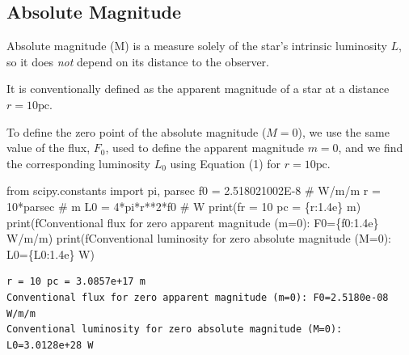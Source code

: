 \documentclass[
  letterpaper,
  DIV=11,
  numbers=noendperiod]{scrreprt}
\newenvironment{Shaded}{\begin{snugshade}}{\end{snugshade}}
\newcommand{\BuiltInTok}[1]{\textcolor[rgb]{0.00,0.23,0.31}{#1}}
\newcommand{\CommentTok}[1]{\textcolor[rgb]{0.37,0.37,0.37}{#1}}
\newcommand{\DecValTok}[1]{\textcolor[rgb]{0.68,0.00,0.00}{#1}}
\newcommand{\FloatTok}[1]{\textcolor[rgb]{0.68,0.00,0.00}{#1}}
\newcommand{\ImportTok}[1]{\textcolor[rgb]{0.00,0.46,0.62}{#1}}
\newcommand{\NormalTok}[1]{\textcolor[rgb]{0.00,0.23,0.31}{#1}}
\newcommand{\OperatorTok}[1]{\textcolor[rgb]{0.37,0.37,0.37}{#1}}
\newcommand{\SpecialCharTok}[1]{\textcolor[rgb]{0.37,0.37,0.37}{#1}}
\newcommand{\SpecialStringTok}[1]{\textcolor[rgb]{0.13,0.47,0.30}{#1}}
\begin{document}
\hypertarget{absolute-magnitude}{%
\subsection{Absolute Magnitude}\label{absolute-magnitude}}

Absolute magnitude (M) is a measure solely of the star's intrinsic
luminosity \(L\), so it does \emph{not} depend on its distance to the
observer.

It is conventionally defined as the apparent magnitude of a star at a
distance \(r=10\mathrm{pc}\).

To define the zero point of the absolute magnitude (\(M=0\)), we use the
same value of the flux, \(F_0\), used to define the apparent magnitude
\(m=0\), and we find the corresponding luminosity \(L_0\) using Equation
(1) for \(r=10\mathrm{pc}\).

\begin{Shaded}
\begin{Highlighting}[]
\ImportTok{from}\NormalTok{ scipy.constants }\ImportTok{import}\NormalTok{ pi, parsec}
\NormalTok{f0 }\OperatorTok{=} \FloatTok{2.518021002E{-}8} \CommentTok{\# W/m/m}
\NormalTok{r }\OperatorTok{=} \DecValTok{10}\OperatorTok{*}\NormalTok{parsec }\CommentTok{\# m}
\NormalTok{L0 }\OperatorTok{=} \DecValTok{4}\OperatorTok{*}\NormalTok{pi}\OperatorTok{*}\NormalTok{r}\OperatorTok{**}\DecValTok{2}\OperatorTok{*}\NormalTok{f0 }\CommentTok{\# W}
\BuiltInTok{print}\NormalTok{(}\SpecialStringTok{f\textquotesingle{}r = 10 pc = }\SpecialCharTok{\{}\NormalTok{r}\SpecialCharTok{:1.4e\}}\SpecialStringTok{ m\textquotesingle{}}\NormalTok{)}
\BuiltInTok{print}\NormalTok{(}\SpecialStringTok{f\textquotesingle{}Conventional flux for zero apparent magnitude (m=0): F0=}\SpecialCharTok{\{}\NormalTok{f0}\SpecialCharTok{:1.4e\}}\SpecialStringTok{ W/m/m\textquotesingle{}}\NormalTok{)}
\BuiltInTok{print}\NormalTok{(}\SpecialStringTok{f\textquotesingle{}Conventional luminosity for zero absolute magnitude (M=0): L0=}\SpecialCharTok{\{}\NormalTok{L0}\SpecialCharTok{:1.4e\}}\SpecialStringTok{ W\textquotesingle{}}\NormalTok{)}
\end{Highlighting}
\end{Shaded}

\begin{verbatim}
r = 10 pc = 3.0857e+17 m
Conventional flux for zero apparent magnitude (m=0): F0=2.5180e-08 W/m/m
Conventional luminosity for zero absolute magnitude (M=0): L0=3.0128e+28 W
\end{verbatim}
\end{document}
